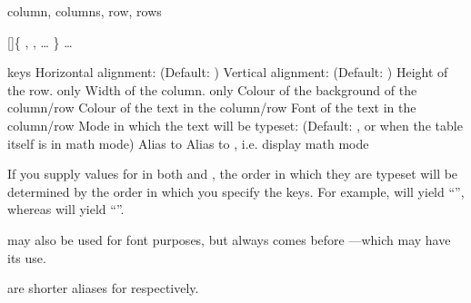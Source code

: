 \begin{codedescribe}[keys, update = 2026A]{column, columns, row, rows}
  \begin{codesyntax}
    []\{
        \quad{},
        \quad{},
        \quad\ldots
        \}
        \quad\ldots
        \tsmacro{\end{tblr}}{}
  \end{codesyntax}
  \begin{describelist*}{keys}
    \label{colrow:positioning}
    {Horizontal alignment:  (Default: )}
    {Vertical alignment:  (Default: )}
    {Height of the row.  only}
    {Width of the column.  only}
    \label{colrow:colour}
    {Colour of the background of the column/row\footnotemark[1]}
    {Colour of the text in the column/row}
    {Font of the text in the column/row}
    {Mode in which the text will be typeset:  (Default: , or  when the table itself is in math mode)}
    \describe{\$}
    {Alias to }
    \describe{\$\$}
    {Alias to , i.e. display math mode}
    \begin{tsremark}
      If you supply values for  in both  and , the order in which they are typeset will be determined by the order in which you specify the keys.
      For example,  will yield ``'', whereas  will yield ``''.
    \end{tsremark}
    \begin{tsremark}
       may also be used for font purposes, but  always comes before ---which may have its use.\footnotemark[2]
    \end{tsremark}
    \begin{tsremark}
       are shorter aliases for  respectively.\footnotemark[3]
    \end{tsremark}
  \end{describelist*}
\end{codedescribe}
